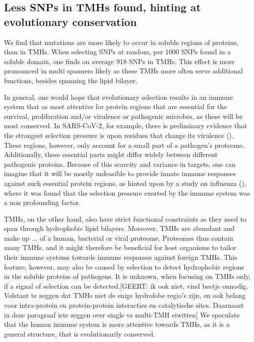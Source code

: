 \subsection{Less SNPs in TMHs found, hinting at evolutionary conservation}

We find that mutations are more likely to occur
in soluble regions of proteins, than in TMHs.
When selecting SNPs at random, per 1000 SNPs found in a soluble domain, 
one finds on average 918 SNPs in TMHs.
This effect is more pronounced in multi spanners likely as these TMHs more often serve additional functions, besides spanning the lipid bilayer. 

 
In general, one would hope that evolutionary selection results in
an immune system that as most attentive for protein regions that are
essential for the survival, proliferation and/or virulence or pathogenic microbes, as these will be most conserved.
In SARS-CoV-2, for example, there is preliminary evidence that the strongest
selection pressure is upon residues that change its 
virulence (\cite{velazquez2020positive}).
These regions, however, only account for a small part of a pathogen's proteome.
Additionally, these essential parts might differ widely between different pathogenic proteins.
Because of this scarcity and variance in targets, 
one can imagine that it will be mostly unfeasible to provide innate immune responses against such essential protein regions, 
as hinted upon by a study on influenza (\cite{han2019individual}),
where it was found that the selection pressure
exerted by the immune system was a non profounding factor.
 

TMHs, on the other hand, also have strict functional constraints as they need to span through hydrophobic lipid bilayers. Moreover, TMHs are abundant and make up ... of a human, bacterial or viral proteome.
Proteomes thus contain many TMHs,
and it might therefore be beneficial for host organisms
to tailor their immune systems towards immune responses against foreign TMHs.
This feature, however, may also be caused by selection
to detect hydrophobic regions in the soluble proteins of pathogens.
It is unknown, when focusing on TMHs only, if a signal of selection
can be detected.[GEERT: ik ook niet, vind beetje onnodig. Volstaat te zeggen dat TMHs niet de enige hydrofobe regio's zijn, en ook belang voor intra-protein en protein-protein interacties en catalytische sites. Daarnaast in deze paragraaf iets zeggen over single vs multi-TMH eiwitten]
We speculate that the human immune system is more attentive 
towards TMHs, as it is a general structure, that is evolutionarily conserved.

